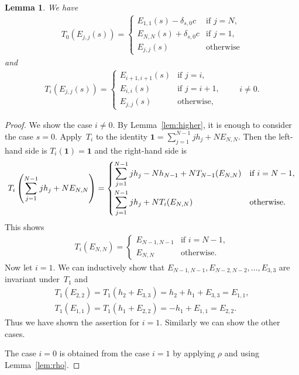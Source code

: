 \documentclass[10pt,a4paper]{amsart}
\newtheorem{lem}[thm]{Lemma}
\theoremstyle{definition}
\numberwithin{equation}{section}
\newcommand{\bfid}{\mathbf{1}}
\begin{document}
\begin{lem}\label{lem:diagonal}We have
\begin{gather*}
T_{0}(E_{j,j}(s)) = \begin{cases}
E_{1,1}(s)-\delta_{s,0}c &\text{if } j=N, \\
E_{N,N}(s)+\delta_{s,0}c &\text{if } j=1, \\
E_{j,j}(s) &\text{otherwise}
\end{cases}
\end{gather*}
and
\begin{gather*}
T_{i}(E_{j,j}(s)) = \begin{cases}
E_{i+1,i+1}(s) &\text{if } j=i, \\
E_{i,i}(s) &\text{if } j=i+1,\\
E_{j,j}(s) \ &\text{otherwise},
\end{cases}\qquad i \neq 0.
\end{gather*}
\end{lem}
\begin{proof}We show the case $i \neq 0$. By Lemma~\ref{lem:higher}, it is enough to consider the case $s=0$. Apply~$T_i$ to the identity $\bfid = \sum\limits_{j=1}^{N-1} j h_j + N E_{N,N}$. Then the left-hand side is $T_i(\bfid) = \bfid$ and the right-hand side is
\begin{gather*}
T_i \left(\sum_{j=1}^{N-1} j h_j + N E_{N,N}\right) = \begin{cases}
\displaystyle\sum_{j=1}^{N-1} j h_j - N h_{N-1} + N T_{N-1}(E_{N,N}) & \text{if $i = N-1$}, \vspace{1mm}\\
\displaystyle\sum_{j=1}^{N-1} j h_j + N T_i(E_{N,N}) & \text{otherwise}.
\end{cases}
\end{gather*}
This shows
\begin{gather*}
T_i (E_{N,N}) = \begin{cases}
E_{N-1,N-1} & \text{if $i = N-1$}, \\
E_{N,N} & \text{otherwise}.
\end{cases}
\end{gather*}
Now let $i=1$. We can inductively show that $E_{N-1,N-1}, E_{N-2,N-2}, \ldots, E_{3,3}$ are invariant under~$T_1$ and
\begin{gather*}
T_1(E_{2,2}) = T_1(h_2 + E_{3,3}) = h_2 + h_1 + E_{3,3} = E_{1,1},\\
T_1(E_{1,1}) = T_1(h_1 + E_{2,2}) = -h_1 + E_{1,1} = E_{2,2}.
\end{gather*}
Thus we have shown the assertion for $i=1$. Similarly we can show the other cases.

The case $i=0$ is obtained from the case $i=1$ by applying $\rho$ and using Lemma~\ref{lem:rho}.
\end{proof}
\end{document}
